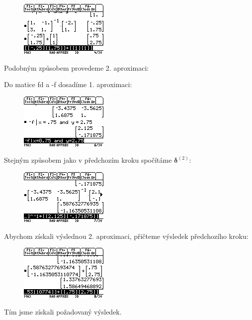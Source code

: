 \documentclass[10pt,a4paper,float]{article}
\begin{document}
\begin{figure}[H]
	\centering
	\includegraphics[width=.5\textwidth]{img/2NEWTON7.PNG}
\end{figure}

\pagebreak

Podobným způsobem provedeme 2. aproximaci:

Do matice fd a -f dosadíme 1. aproximaci:

\begin{figure}[H]
	\centering
	\includegraphics[width=.5\textwidth]{img/2NEWTON8.PNG}
\end{figure}

Stejným způsobem jako v předchozím kroku spočítáme $\boldsymbol{\delta}^{(2)}$:

\begin{figure}[H]
	\centering
	\includegraphics[width=.5\textwidth]{img/2NEWTON9.PNG}
\end{figure}

Abychom získali výslednou 2. aproximaci, přičteme výsledek předchozího kroku:

\begin{figure}[H]
	\centering
	\includegraphics[width=.5\textwidth]{img/2NEWTON10.PNG}
\end{figure}

Tím jsme získali požadovaný výsledek.
\end{document}
